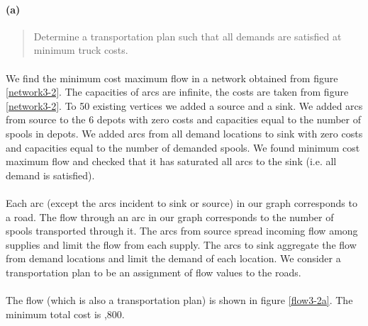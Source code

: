 \paragraph{(a)}
\begin{quote}
Determine a transportation plan such that all demands are satisfied at minimum truck costs.
\end{quote}

\paragraph{}
\paragraph{}
We find the minimum cost maximum flow in a network obtained from figure \ref{network3-2}. The capacities of arcs are infinite, the costs are taken from figure \ref{network3-2}. To 50 existing vertices we added a source and a sink. We added arcs from source to the 6 depots with zero costs and capacities equal to the number of spools in depots. We added arcs from all demand locations to sink with zero costs and capacities equal to the number of demanded spools. We found minimum cost maximum flow and checked that it has saturated all arcs to the sink (i.e. all demand is satisfied).

\paragraph{}
Each arc (except the arcs incident to sink or source) in our graph corresponds to a road. The flow through an arc in our graph corresponds to the number of spools transported through it. The arcs from source spread incoming flow among supplies and limit the flow from each supply. The arcs to sink aggregate the flow from demand locations and limit the demand of each location. We consider a transportation plan to be an assignment of flow values to the roads.

\paragraph{}
The flow (which is also a transportation plan) is shown in figure \ref{flow3-2a}. The minimum total cost is ,800.

